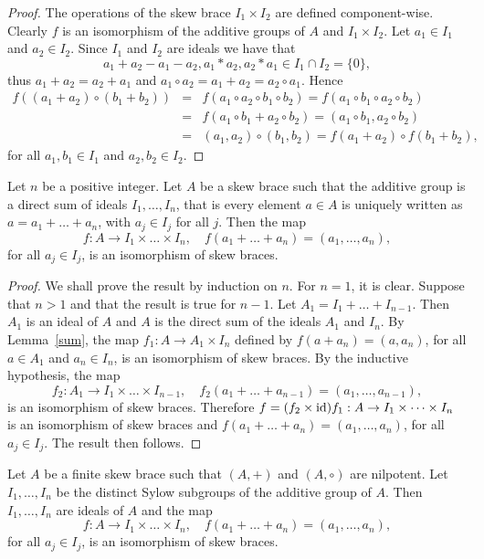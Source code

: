 \begin{proof}
The operations of the skew  brace $I_1\times I_2$
are defined component-wise. Clearly $f$ is an isomorphism of the
additive groups of $A$ and $I_1\times I_2$. Let $a_1\in I_1$ and
$a_2\in I_2$. Since $I_1$ and $I_2$ are ideals we have that
$$a_1+a_2-a_1-a_2, a_1*a_2, a_2*a_1\in I_1\cap I_2=\{ 0\},$$
thus $a_1+a_2=a_2+a_1$ and $a_1\circ a_2=a_1+a_2=a_2\circ a_1$.
Hence
\begin{eqnarray*} f((a_1+a_2)\circ (b_1+b_2))&=&f(a_1\circ
a_2\circ b_1\circ b_2)=
f(a_1\circ b_1\circ a_2\circ b_2)\\
&=&f(a_1\circ b_1 + a_2\circ b_2)=(a_1\circ b_1 , a_2\circ b_2)\\
&=&(a_1,a_2)\circ (b_1,b_2)=f(a_1+a_2)\circ f(b_1 +b_2),
\end{eqnarray*}
for all $a_1,b_1\in I_1$ and $a_2,b_2\in I_2$. 
\end{proof}

\begin{theorem}
    \label{thm:direct}
    Let $n$ be a positive integer. Let $A$ be a skew  brace such that the additive
group is a direct sum of ideals $I_1,\dots ,I_n$, that is every
element $a\in A$ is uniquely written as $a=a_1+\dots +a_n$, with
$a_j\in I_j$ for all $j$. Then the map \[
f:A\rightarrow
I_1\times\dots\times I_n,
\quad
f(a_1+\dots +a_n)=(a_1,\dots
,a_n),
\]
for all $a_j\in I_j$, is an isomorphism of skew braces.
\end{theorem}

\begin{proof}
We shall prove the result by induction on $n$. For $n=1$, it is
clear. Suppose that $n>1$ and that the result is true for $n-1$. Let
$A_1=I_1+\dots +I_{n-1}$. Then $A_1$ is an ideal of $A$ and $A$ is
the direct sum of the ideals $A_1$ and $I_n$. By Lemma~\ref{sum},
the map $f_1: A\rightarrow A_1\times I_n$ defined by
$f(a+a_n)=(a,a_n)$, for all $a\in A_1$ and $a_n\in I_n$, is an
isomorphism of skew braces. By the inductive hypothesis, the
map
\[
    f_2:A_1\rightarrow I_1\times \dots\times I_{n-1},
    \quad
    f_2(a_1+\dots +a_{n-1})=(a_1,\dots ,a_{n-1}),
\]
is an isomorphism of skew braces. Therefore $f=(f_2\times
\operatorname{id})f_1:A\rightarrow I_1\times\dots\times I_n$ is an
isomorphism of skew braces and $f(a_1+\dots +a_n)=(a_1,\dots
,a_n)$, for all $a_j\in I_j$. The result then follows.
\end{proof}

\begin{corollary}
    \label{cor:product}
    Let $A$ be a finite skew brace such that $(A,+)$ and $(A,\circ)$ are nilpotent.
Let $I_1,\dots ,I_n$ be the distinct Sylow subgroups of the additive
group of $A$. Then $I_1,\dots ,I_n$ are ideals of $A$ and the map
\[
f:A\rightarrow I_1\times\dots\times I_n,
\quad
f(a_1+\dots+a_n)=(a_1,\dots ,a_n),
\]
for all $a_j\in I_j$, is an isomorphism of
skew braces.
\end{corollary}

